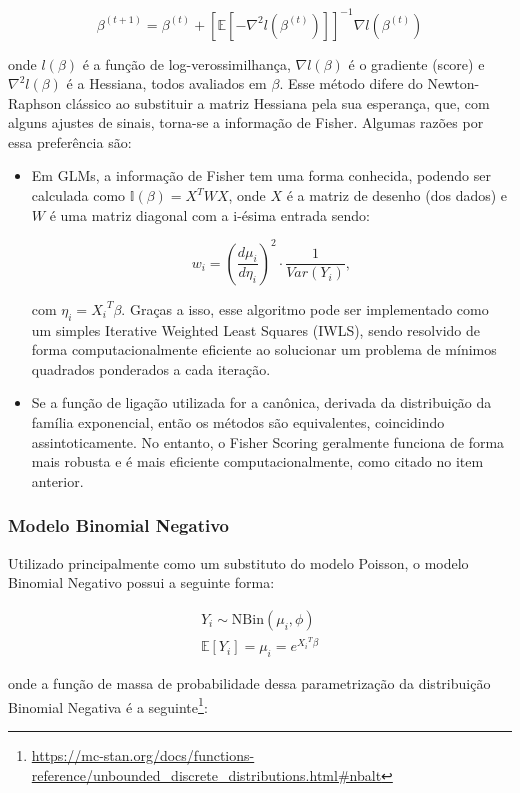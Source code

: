 \documentclass[
  twocolumn]{article}
\begin{document}
\[
\beta^{(t+1)} = \beta^{(t)} + [\mathbb{E}[-\nabla^2 l(\beta^{(t)})]]^{-1} \nabla l(\beta^{(t)})
\]

onde \(l(\beta)\) é a função de log-verossimilhança, \(\nabla l(\beta)\)
é o gradiente (score) e \(\nabla^2 l(\beta)\) é a Hessiana, todos
avaliados em \(\beta\). Esse método difere do Newton-Raphson clássico ao
substituir a matriz Hessiana pela sua esperança, que, com alguns ajustes
de sinais, torna-se a informação de Fisher. Algumas razões por essa
preferência são:

\begin{itemize}
\item
  Em GLMs, a informação de Fisher tem uma forma conhecida, podendo ser
  calculada como \(\mathbb{I}(\beta) = X^TWX\), onde \(X\) é a matriz de
  desenho (dos dados) e \(W\) é uma matriz diagonal com a i-ésima
  entrada sendo:

  \[
  w_i = \left(\dfrac{d\mu_i}{d\eta_i}\right)^2 \cdot \dfrac{1}{Var(Y_i)},
  \]

  com \(\eta_i = {X_i}^T\beta\). Graças a isso, esse algoritmo pode ser
  implementado como um simples Iterative Weighted Least Squares (IWLS),
  sendo resolvido de forma computacionalmente eficiente ao solucionar um
  problema de mínimos quadrados ponderados a cada iteração.
\item
  Se a função de ligação utilizada for a canônica, derivada da
  distribuição da família exponencial, então os métodos são
  equivalentes, coincidindo assintoticamente. No entanto, o Fisher
  Scoring geralmente funciona de forma mais robusta e é mais eficiente
  computacionalmente, como citado no item anterior.
\end{itemize}

\subsubsection{Modelo Binomial Negativo}\label{modelo-binomial-negativo}

Utilizado principalmente como um substituto do modelo Poisson, o modelo
Binomial Negativo possui a seguinte forma:

\[
\begin{array}{c}
Y_i \sim \text{NBin}(\mu_i, \phi) \\
\mathbb{E}[Y_i] = \mu_i = e^{{X_i}^T\beta}
\end{array}
\]

onde a função de massa de probabilidade dessa parametrização da
distribuição Binomial Negativa é a seguinte\footnote{\url{https://mc-stan.org/docs/functions-reference/unbounded_discrete_distributions.html\#nbalt}}:
\end{document}
